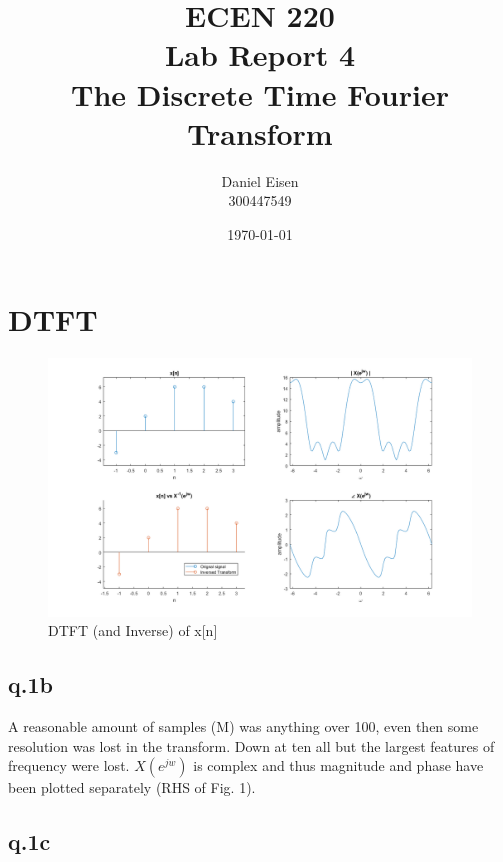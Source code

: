 \documentclass[11pt]{article}
\title{ECEN 220 \\ Lab Report 4 \\ The Discrete Time Fourier Transform}
\author{Daniel Eisen \\ 300447549}
\date{\today}
\begin{document}
\maketitle

\section{DTFT}
\begin{figure}[h]
	\includegraphics[width=\textwidth]{q1_n=100}
	\caption{DTFT (and Inverse) of x[n]}
\end{figure}
\subsection{q.1b}
A reasonable amount of samples (M) was anything over 100, even then some resolution was lost in the transform. Down at ten all but the largest features of frequency were lost. $X(e^{jw})$ is complex and thus magnitude and phase have been plotted separately (RHS of Fig. 1).

\newpage
\subsection{q.1c}
\end{document}
